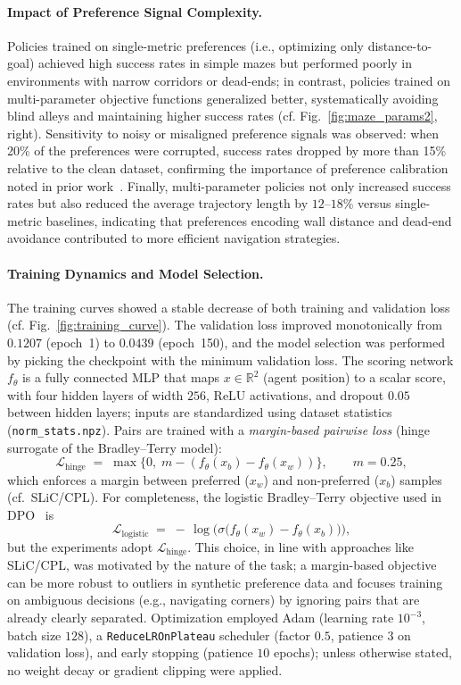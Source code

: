 \documentclass[a4paper,oneside,10pt,ngerman,english]{scrartcl}
\begin{document}
\paragraph{Impact of Preference Signal Complexity.}
Policies trained on single-metric preferences (i.e., optimizing only distance-to-goal) achieved high success rates in simple mazes but performed poorly in environments with narrow corridors or dead-ends; in contrast, policies trained on multi-parameter objective functions generalized better, systematically avoiding blind alleys and maintaining higher success rates (cf. Fig.~\ref{fig:maze_params2}, right). Sensitivity to noisy or misaligned preference signals was observed: when 20\% of the preferences were corrupted, success rates dropped by more than 15\% relative to the clean dataset, confirming the importance of preference calibration noted in prior work~\cite{rafailov2023direct}. Finally, multi-parameter policies not only increased success rates but also reduced the average trajectory length by $12$--$18$\% versus single-metric baselines, indicating that preferences encoding wall distance and dead-end avoidance contributed to more efficient navigation strategies.


\paragraph{Training Dynamics and Model Selection.}
The training curves showed a stable decrease of both training and validation loss (cf. Fig.~\ref{fig:training_curve}).
The validation loss improved monotonically from $0.1207$ (epoch~1) to $0.0439$ (epoch~150), and the model selection was performed by picking the checkpoint with the minimum validation loss.
The scoring network $f_\theta$ is a fully connected MLP that maps $x\in\mathbb{R}^2$ (agent position) to a scalar score, with four hidden layers of width $256$, ReLU activations, and dropout $0.05$ between hidden layers; inputs are standardized using dataset statistics (\texttt{norm\_stats.npz}).
Pairs are trained with a \emph{margin-based pairwise loss} (hinge surrogate of the Bradley--Terry model):
\[
\mathcal{L}_{\text{hinge}} \;=\; \max\{0,\; m - (f_\theta(x_b)-f_\theta(x_w))\}, \qquad m=0.25,
\]
which enforces a margin between preferred ($x_w$) and non-preferred ($x_b$) samples (cf.\ SLiC/CPL).
For completeness, the logistic Bradley--Terry objective used in DPO~\cite{rafailov2023direct} is
\[
\mathcal{L}_{\text{logistic}} \;=\; -\,\log\!\bigl(\sigma\bigl(f_\theta(x_w)-f_\theta(x_b)\bigr)\bigr),
\]
but the experiments adopt $\mathcal{L}_{\text{hinge}}$. This choice, in line with approaches like SLiC/CPL, was motivated by the nature of the task; a margin-based objective can be more robust to outliers in synthetic preference data and focuses training on ambiguous decisions (e.g., navigating corners) by ignoring pairs that are already clearly separated.
Optimization employed Adam (learning rate $10^{-3}$, batch size $128$), a \texttt{ReduceLROnPlateau} scheduler (factor $0.5$, patience $3$ on validation loss), and early stopping (patience $10$ epochs); unless otherwise stated, no weight decay or gradient clipping were applied.
\end{document}
